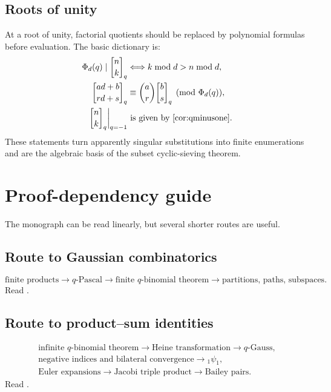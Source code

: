 \documentclass[11pt,oneside,openany]{book}
\theoremstyle{definition}
\theoremstyle{remark}
\newcommand{\qbinom}[2]{\genfrac{[}{]}{0pt}{}{#1}{#2}_{q}}
\newcommand{\Qbinom}[3]{\genfrac{[}{]}{0pt}{}{#1}{#2}_{#3}}
\begin{document}
\section{Roots of unity}

At a root of unity, factorial quotients should be replaced by polynomial formulas before evaluation.  The basic dictionary is:
\begin{align*}
 \Phi_d(q)\mid\qbinom nk
 &\Longleftrightarrow k\bmod d>n\bmod d,\\
 \Qbinom{ad+b}{rd+s}q
 &\equiv\binom ar\Qbinom bsq\pmod{\Phi_d(q)},\\
 \qbinom nk\bigg|_{q=-1}
 &\text{ is given by \Cref{cor:qminusone}.}
\end{align*}
These statements turn apparently singular substitutions into finite enumerations and are the algebraic basis of the subset cyclic-sieving theorem.

\chapter{Proof-dependency guide}\label{app:dependencies}

The monograph can be read linearly, but several shorter routes are useful.

\section*{Route to Gaussian combinatorics}
\[
 \text{finite products}
 \longrightarrow q\text{-Pascal}
 \longrightarrow \text{finite }q\text{-binomial theorem}
 \longrightarrow \text{partitions, paths, subspaces}.
\]
Read .

\section*{Route to product--sum identities}
\[
\begin{gathered}
 \text{infinite }q\text{-binomial theorem}
 \longrightarrow \text{Heine transformation}
 \longrightarrow q\text{-Gauss},\\
 \text{negative indices and bilateral convergence}
 \longrightarrow {}_1\psi_1,\\
 \text{Euler expansions}
 \longrightarrow \text{Jacobi triple product}
 \longrightarrow \text{Bailey pairs}.
\end{gathered}
\]
Read .
\end{document}
